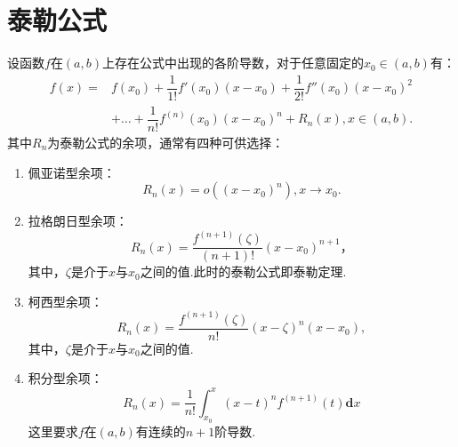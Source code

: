 \section{泰勒公式}

\begin{theorem}[泰勒公式]
	设函数$f$在$(a,b)$上存在公式中出现的各阶导数，对于任意固定的$x_0\in(a,b)$有：
	\begin{equation}
		\begin{split}
			f(x) = & f(x_0)+\dfrac{1}{1!}f'(x_0)(x-x_0)+\dfrac{1}{2!}f''(x_0)(x-x_0)^2 \\ & +\dots+\dfrac{1}{n!}f^{(n)}(x_0)(x-x_0)^n+R_n(x),x\in(a,b).
			\end{split}
	\end{equation}
	其中$R_n$为泰勒公式的余项，通常有四种可供选择：
	\begin{enumerate}
		\item 佩亚诺型余项：
		\begin{equation}
			R_n(x)=o((x-x_0)^n),x\rightarrow x_0.
		\end{equation}
		\item 拉格朗日型余项：
		\begin{equation}
			R_n(x)=\dfrac{f^{(n+1)}(\zeta)}{(n+1)!}(x-x_0)^{n+1}，
		\end{equation}
		其中，$\zeta$是介于$x$与$x_0$之间的值.此时的泰勒公式即泰勒定理.
		\item 柯西型余项：
		\begin{equation}
			R_n(x)=\dfrac{f^{(n+1)}(\zeta)}{n!}(x-\zeta)^n(x-x_0),
		\end{equation}
		其中，$\zeta$是介于$x$与$x_0$之间的值.
		\item 积分型余项：
		\begin{equation}
			R_n(x)=\dfrac{1}{n!}\int_{x_0}^{x}(x-t)^nf^{(n+1)}(t)\textbf{d}x
		\end{equation}
		这里要求$f$在$(a,b)$有连续的$n+1$阶导数.
	\end{enumerate}
\end{theorem}